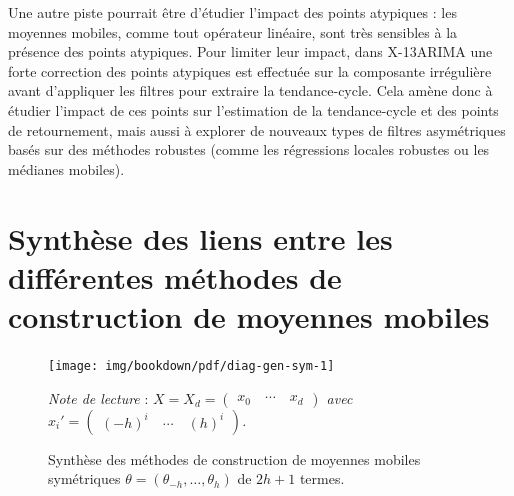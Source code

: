\documentclass[
  12pt,
  french,
  12pt,a4paper]{article}
\newcommand\1{\mathds{1}}
\begin{document}
Une autre piste pourrait être d'étudier l'impact des points atypiques : les moyennes mobiles, comme tout opérateur linéaire, sont très sensibles à la présence des points atypiques.
Pour limiter leur impact, dans X-13ARIMA une forte correction des points atypiques est effectuée sur la composante irrégulière avant d'appliquer les filtres pour extraire la tendance-cycle.
Cela amène donc à étudier l'impact de ces points sur l'estimation de la tendance-cycle et des points de retournement, mais aussi à explorer de nouveaux types de filtres asymétriques basés sur des méthodes robustes (comme les régressions locales robustes ou les médianes mobiles).

\newpage

\hypertarget{appendix-annexe}{%
\appendix}


\newpage

\hypertarget{an-diag}{%
\section{Synthèse des liens entre les différentes méthodes de construction de moyennes mobiles}\label{an-diag}}

\begin{figure}[!ht]

{\centering \texttt{[image: img/bookdown/pdf/diag-gen-sym-1]} 

}

\caption[Synthèse des méthodes de construction de moyennes mobiles symétriques \(\theta=(\theta_{-h},\dots,\theta_{h})\) de \(2h+1\) termes]{Synthèse des méthodes de construction de moyennes mobiles symétriques \(\theta=(\theta_{-h},\dots,\theta_{h})\) de \(2h+1\) termes.}\label{fig:diag-gen-sym}

\footnotesize


\emph{Note de lecture} : \emph{\(X = X_d = \begin{pmatrix} x_0 \quad\cdots \quad x_d \end{pmatrix}\) avec \(x_i'=\begin{pmatrix} (-h)^i \quad \cdots \quad (h)^i\end{pmatrix}\).}
\normalsize\end{figure}
\end{document}
